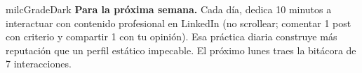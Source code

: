 \documentclass[11pt,letterpaper]{article}
\begin{document}
\begin{infoband}{milcGradeDark}
\textbf{Para la próxima semana.} Cada día, dedica 10 minutos a interactuar con contenido profesional en LinkedIn (no scrollear; comentar 1 post con criterio y compartir 1 con tu opinión). Esa práctica diaria construye más reputación que un perfil estático impecable. El próximo lunes traes la bitácora de 7 interacciones.
\end{infoband}
\end{document}
